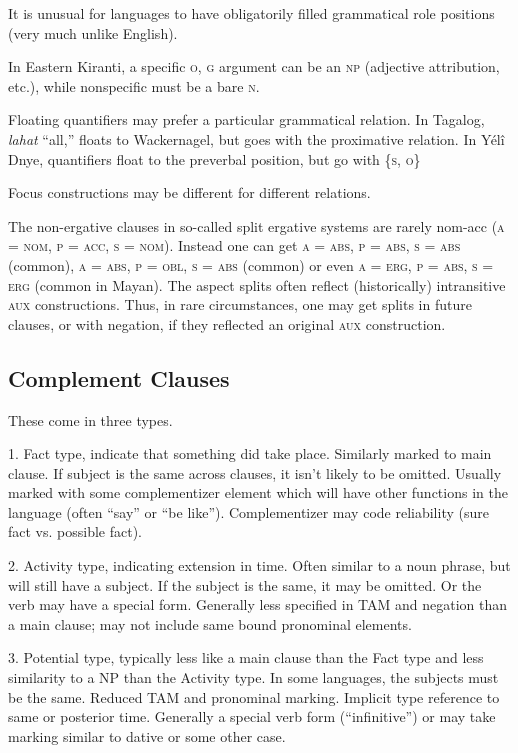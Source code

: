 \documentclass[11pt]{article}
\newcommand{\I}[1]{\textsc{#1}}   %
\begin{document}
It is unusual for languages to have obligatorily filled grammatical
role positions (very much unlike English).

In Eastern Kiranti, a specific \I{o, g} argument can be an \I{np}
(adjective attribution, etc.), while nonspecific must be a bare
\I{n}.

Floating quantifiers may prefer a particular grammatical relation.  In
Tagalog, \textit{lahat} ``all,'' floats to Wackernagel, but goes with
the proximative relation.  In Yélî Dnye, quantifiers float to the
preverbal position, but go with \{\I{s, o}\}

Focus constructions may be different for different relations.

The non-ergative clauses in so-called split ergative systems are
rarely nom-acc (\I{a = nom, p = acc, s = nom}).  Instead one can get
\I{a = abs, p = abs, s = abs} (common), \I{a = abs, p = obl, s = abs}
(common) or even \I{a = erg, p = abs, s = erg} (common in Mayan).  The
aspect splits often reflect (historically) intransitive \I{aux}
constructions.  Thus, in rare circumstances, one may get splits in
future clauses, or with negation, if they reflected an original
\I{aux} construction.


\subsection{Complement Clauses}
These come in three types.

1.  Fact type, indicate that something did take place.  Similarly
marked to main clause.  If subject is the same across clauses, it
isn't likely to be omitted.  Usually marked with some complementizer
element which will have other functions in the language (often ``say''
or ``be like'').  Complementizer may code reliability (sure fact
vs. possible fact).

2. Activity type, indicating extension in time.  Often similar to a
noun phrase, but will still have a subject.  If the subject is the
same, it may be omitted.  Or the verb may have a special form.
Generally less specified in TAM and negation than a main clause; may
not include same bound pronominal elements.

3. Potential type, typically less like a main clause than the Fact
type and less similarity to a NP than the Activity type.  In some
languages, the subjects must be the same.  Reduced TAM and pronominal
marking.  Implicit type reference to same or posterior time.
Generally a special verb form (``infinitive'') or may take marking
similar to dative or some other case.
\end{document}
